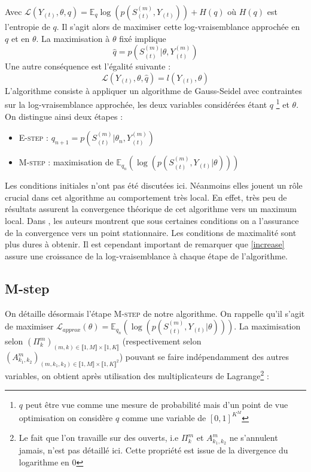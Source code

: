 \documentclass[10pt,a4paper]{article}
\newcommand{\Estep}{\textsc{E-step}}
\newcommand{\Mstep}{\textsc{M-step}}
\begin{document}
Avec $\mathcal{L}(Y_{(t)},\theta,q)=\mathbb{E}_q \log \left( p(S_{(t)}^{(m)}, 
Y_{(t)})\right)+H(q)$ où $H(q)$ est l'entropie de $q$. Il s'agit alors de 
maximiser cette log-vraisemblance approchée en $q$ et en $\theta$. La 
maximisation à $\theta$ fixé implique 
\begin{equation}
\hat{q}=p(S_{(t)}^{(m)} \vert \theta,Y_{(t)}^{(m)})
\end{equation} 
Une autre conséquence est l'égalité suivante :
\begin{equation}
\mathcal{L}(Y_{(t)},\theta,\hat{q})=l(Y_{(t)},\theta) \label{increase}
\end{equation}
L'algorithme consiste à appliquer un algorithme de Gauss-Seidel avec 
contraintes sur la log-vraisemblance approchée, les deux variables considérées 
étant $q$ \footnote{$q$ peut être vue comme une mesure de probabilité mais d'un 
point de vue optimisation on considère $q$ comme une variable de $[0,1]^{K^M}$} 
et $\theta$. On distingue ainsi deux étapes :
\begin{itemize}
\item \Estep{} : $q_{n+1}=p(S_{(t)}^{(m)} \vert \theta_n,Y_{(t)}^{(m)})$
\item \Mstep{} : maximisation de $\mathbb{E}_{q_n} \left( \log \left( 
p(S_{(t)}^{(m)}, Y_{(t)}  \vert  \theta )\right) \right)$
\end{itemize}
Les conditions initiales n'ont pas été discutées ici. Néanmoins elles jouent un 
rôle crucial dans cet algorithme au comportement très local. En effet, très peu 
de résultats assurent la convergence théorique de cet algorithme vers un 
maximum local. Dans \cite{wu1983convergence}, les auteurs montrent que sous 
certaines conditions on a l'assurance de la convergence vers un point 
stationnaire. Les conditions de maximalité sont plus dures à obtenir. Il est 
cependant important de remarquer que \ref{increase} assure une croissance de la 
log-vraisemblance à chaque étape de l'algorithme.

\subsection{M-step}

On détaille désormais l'étape \Mstep{} de notre algorithme.
On rappelle qu'il s'agit de maximiser
$\mathcal{L}_{approx}(\theta)=\mathbb{E}_{q_n}
\left( \log \left( p(S_{(t)}^{(m)},Y_{(t)}\vert \theta)\right)\right)$.
La maximisation selon
$(\Pi_{k}^m)_{(m,k) \in
\llbracket 1,M \rrbracket \times \llbracket 1,K \rrbracket}$
(respectivement selon
$(A_{k_1,k_2}^m)_{(m,k_1,k_2) \in
\llbracket 1,M \rrbracket \times \llbracket 1,K \rrbracket^2}$) pouvant se faire 
indépendamment des autres variables, on obtient après utilisation des 
multiplicateurs de Lagrange\footnote{Le fait que l'on travaille sur des 
ouverts, i.e $\Pi_{k}^m$ et $A_{k_1,k_2}^m$ ne s'annulent jamais, n'est pas 
détaillé ici. Cette propriété est issue de la divergence du logarithme en $0$} :
\end{document}
